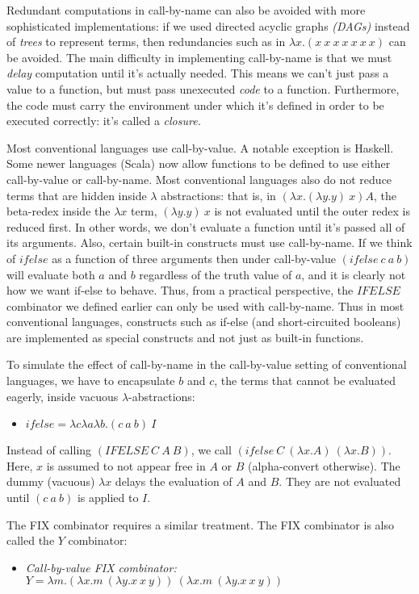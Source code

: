 Redundant computations in call-by-name can also be avoided with more
sophisticated implementations:
if we used directed acyclic graphs {\em (DAGs)\/} instead of {\em trees\/} to
represent terms, then redundancies such as in $\lambda x.(x~x~x~x~x~x~x)$
can be avoided.  The main difficulty in implementing call-by-name is that
we must {\em delay\/} computation until it's actually needed.  This means we
can't just pass a value to a function, but must pass unexecuted {\em code\/}
to a function.  Furthermore, the code must carry the environment under which
it's defined in order to be executed correctly: it's called a {\em closure.\/}

Most conventional languages use call-by-value.  A notable exception is Haskell.
Some newer languages (Scala) now allow functions to be defined to use either
call-by-value or call-by-name.  Most conventional languages also do not
reduce terms that are hidden inside $\lambda$ abstractions: that is, in
$(\lambda x. (\lambda y.y)~x) A$, the beta-redex inside the $\lambda x$ term,
$(\lambda y.y)~x$ is not evaluated until the outer redex is reduced first.
In other words, we don't evaluate a function until it's passed all of its
arguments.  Also, certain built-in constructs must use call-by-name.  If we think
of $ifelse$ as a function of three arguments then under call-by-value
$(ifelse ~c~a~b)$ will evaluate both $a$ and $b$ regardless of the truth value
of $a$, and it is clearly not how we want if-else to behave.  Thus, from
a practical perspective, the $IFELSE$ combinator we defined earlier can only
be used with call-by-name.  Thus in most conventional languages, constructs
such as if-else (and short-circuited booleans) are
implemented as special constructs and not just as built-in functions.

To simulate the effect of call-by-name in the call-by-value 
setting of conventional languages, we have to encapsulate $b$ and $c$,
the terms that cannot be evaluated eagerly, inside vacuous 
$\lambda$-abstractions:
\begin{itemize}
\item $ifelse = \lambda c\lambda a\lambda b.(c~ a ~ b) ~I$
\end{itemize}
Instead of calling $(IFELSE ~ C~A~B)$, we call
$(ifelse~ C ~ (\lambda x.A) ~ (\lambda x.B))$. Here, $x$ is assumed to not
appear free in $A$ or $B$ (alpha-convert otherwise).
The dummy (vacuous) $\lambda x$
delays the evaluation of $A$ and $B$.  They are not evaluated until
$(c~a~b)$ is applied to $I$.

The FIX combinator requires a similar treatment.  The FIX combinator is
also called the $Y$ combinator:
\begin{itemize}
\item {\em Call-by-value FIX combinator:\/}
  $Y = \lambda m.(\lambda x.m~(\lambda y.x~x~y))~(\lambda x.m~(\lambda y.x~x~y))$
\end{itemize}

